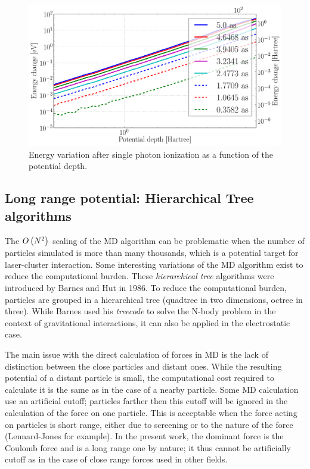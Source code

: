 \begin{figure}
 \centering
 \includegraphics[width=\figurewidth]{figures/numerical_heating_D}
 \caption{\label{fig:potential:heating:depth}Energy variation after single photon
          ionization as a function of the potential depth.}
\end{figure}





\subsection{Long range potential: Hierarchical Tree algorithms}

The $O\left( N^2 \right)$ scaling of the MD algorithm can be problematic when the number of
particles simulated is more than many thousands, which is a potential target
for laser-cluster interaction. Some interesting variations of the MD algorithm
exist to reduce the computational burden. These \textit{hierarchical tree}
algorithms were introduced by Barnes and Hut in 1986\cite{Barnes1986}. To
reduce the computational burden, particles are grouped in a hierarchical tree
(quadtree in two dimensions, octree in three). While Barnes used his
\textit{treecode} to solve the N-body problem in the context of gravitational
interactions, it can also be applied in the electrostatic case.

The main issue with the direct calculation of forces in MD is the lack of
distinction between the close particles and distant ones. While the resulting
potential of a distant particle is small, the computational cost required to
calculate it is the same as in the case of a nearby particle. Some MD
calculation use an artificial cutoff; particles farther then this cutoff will
be ignored in the calculation of the force on one particle. This is acceptable
when the force acting on particles is short range, either due to screening or
to the nature of the force (Lennard-Jones for example).
In the present work, the dominant force is the
Coulomb force and is a long range one by nature; it thus cannot be artificially
cutoff as in the case of close range forces used in other fields.

